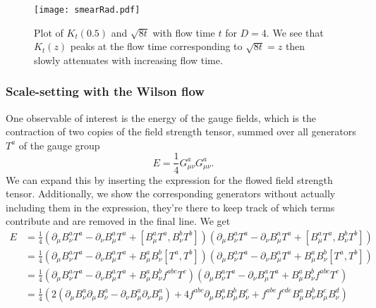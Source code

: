 \documentclass[a4paper,10pt]{article}
\begin{document}
\begin{figure}[H]
\centering

\texttt{[image: smearRad.pdf]}
\caption[]{Plot of $K_t(0.5)$ and $\sqrt{8t}$ with flow time $t$ for $D=4$. We see that $K_t(z)$ peaks at the flow time corresponding to $\sqrt{8t}=z$ then slowly attenuates with increasing flow time. }\label{fig:flowTimeMeanSquareRadius}
\end{figure}

\subsubsection{Scale-setting with the Wilson flow}
One observable of interest is the energy of the gauge fields, which is the contraction of two copies of the field strength tensor, summed over all generators $T^a$ of the gauge group 
\begin{equation}
E=\frac{1}{4} G_{\mu \nu}^{a} G_{\mu \nu}^{a}.
\end{equation}
We can expand this by inserting the expression for the flowed field strength tensor. Additionally, we show the corresponding generators without actually including them in the expression, they're there to keep track of which terms contribute and are removed in the final line. We get
\begin{equation}
\begin{aligned} 
E&=\frac{1}{4} \left( \partial_{\mu} B^{a}_{\nu}T^{a}-\partial_{\nu} B^{a}_{\mu}T^{a}+\left[B^{a}_{\mu}T^{a}, B^{b}_{\nu}T^{b}\right] \right)\left( \partial_{\mu} B^{a}_{\nu}T^{a}-\partial_{\nu} B^{a}_{\mu}T^{a}+\left[B^{a}_{\mu}T^{a}, B^{b}_{\nu}T^{b}\right] \right)\\
&=\frac{1}{4} \left( \partial_{\mu} B^{a}_{\nu}T^{a}-\partial_{\nu} B^{a}_{\mu}T^{a}+B^{a}_{\mu}B^{b}_{\nu}\left[T^{a}, T^{b}\right] \right)\left( \partial_{\mu} B^{a}_{\nu}T^{a}-\partial_{\nu} B^{a}_{\mu}T^{a}+B^{a}_{\mu}B^{b}_{\nu}\left[T^{a}, T^{b}\right] \right)\\
&=\frac{1}{4} \left( \partial_{\mu} B^{a}_{\nu}T^{a}-\partial_{\nu} B^{a}_{\mu}T^{a}+B^{a}_{\mu}B^{b}_{\nu}f^{a b c} T^{c} \right)\left( \partial_{\mu} B^{a}_{\nu}T^{a}-\partial_{\nu} B^{a}_{\mu}T^{a}+B^{a}_{\mu}B^{b}_{\nu}f^{a b c} T^{c} \right)\\
&=\frac{1}{4}  \left( 2\left(\partial_{\mu} B^{a}_{\nu}\partial_{\mu} B^{a}_{\nu}-\partial_{\nu} B^{a}_{\mu}\partial_{\nu} B^{a}_{\mu}\right)+4f^{a b c}\partial_{\mu} B^{a}_{\nu} B^{b}_{\mu}B^{c}_{\nu}  + f^{a b e} f^{cde}  B^{a}_{\mu}B^{b}_{\nu} B^{c}_{\mu}B^{d}_{\nu} \right)
\end{aligned}
\end{equation}
\end{document}
